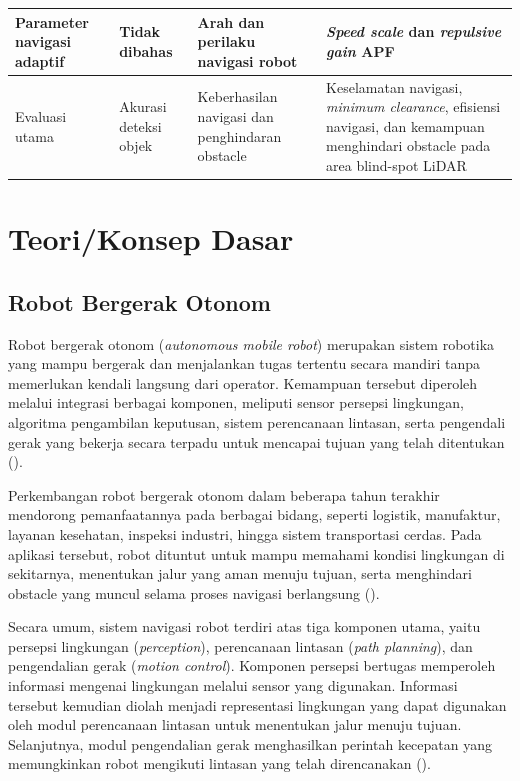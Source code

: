 \begin{table}[H]
\begin{tabularx}{0.95\textwidth}{|>{\raggedright\arraybackslash}p{2.1cm}|X|X|X|}
Parameter navigasi adaptif &
Tidak dibahas &
Arah dan perilaku navigasi robot &
\textit{Speed scale} dan \textit{repulsive gain} APF \\
\hline

Evaluasi utama &
Akurasi deteksi objek &
Keberhasilan navigasi dan penghindaran obstacle &
Keselamatan navigasi, \textit{minimum clearance}, efisiensi navigasi, d\-an kemampuan menghindari obstacle pada area blind-spot LiDAR \\
\hline

\end{tabularx}
\end{table}

\section{Teori/Konsep Dasar}
\label{sec:konsep dasar}

\subsection{Robot Bergerak Otonom}

Robot bergerak otonom (\textit{autonomous mobile robot}) merupakan sistem robotika yang ma\-mpu bergerak dan menjalankan tugas tertentu secara mandiri tanpa memerlukan kendali langsung dari operator. Kemampuan tersebut diperoleh melalui integrasi berbagai komponen, mel\-iputi sensor persepsi lingkungan, algoritma pengambilan keputusan, sistem perencanaan lintasan, serta pengendali gerak yang bekerja secara terpadu untuk mencapai tujuan yang telah ditentukan (\cite{Liu2024}).

Perkembangan robot bergerak otonom dalam beberapa tahun terakhir mendorong pemanfaatannya pada berbagai bidang, seperti logistik, manufaktur, layanan kesehatan, inspeksi industri, hingga sistem transportasi cerdas. Pada aplikasi tersebut, robot dituntut untuk mampu memahami kondisi lingkungan di sekitarnya, menentukan jalur yang aman menuju tujuan, serta menghindari obstacle yang muncul selama proses navigasi berlangsung (\cite{Macenski2022}).

Secara umum, sistem navigasi robot terdiri atas tiga komponen utama, yaitu persepsi lingkungan (\textit{perception}), perencanaan lintasan (\textit{path planning}), dan pengendalian gerak (\textit{motion control}). Komponen persepsi bertugas memperoleh informasi mengenai lingkungan melalui sensor yang digunakan. Informasi tersebut kemudian diolah menjadi representasi lingkungan yang dapat digunakan oleh modul perencanaan lintasan untuk menentukan jalur menuju tujuan. Selanjutnya, modul pengendalian gerak menghasilkan perintah kecepatan yang memungkinkan robot mengikuti lintasan yang telah direncanakan (\cite{Liu2024}).

